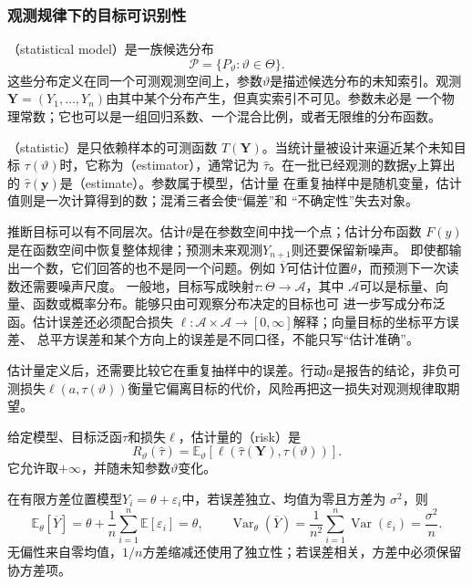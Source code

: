 \subsubsection{观测规律下的目标可识别性}
\label{sec:statistics-model-target}
\begin{definition}[统计模型与统计量]
  \label{def:statistics-model-statistic}
（statistical model）是一族候选分布
\[
  \mathcal{P}=\{P_\vartheta:\vartheta\in\Theta\}.
\]
这些分布定义在同一个可测观测空间上，参数\(\vartheta\)是描述候选分布的未知索引。观测
\(\bm{Y}=(Y_1,\ldots,Y_n)\)由其中某个分布产生，但真实索引不可见。参数未必是
一个物理常数；它也可以是一组回归系数、一个混合比例，或者无限维的分布函数。

（statistic）是只依赖样本的可测函数
\(T(\bm{Y})\)。当统计量被设计来逼近某个未知目标
\(\tau(\vartheta)\)时，它称为（estimator），通常记为
\(\widehat{\tau}\)。在一批已经观测的数据\(\bm{y}\)上算出的
\(\widehat{\tau}(\bm{y})\)是（estimate）。参数属于模型，估计量
在重复抽样中是随机变量，估计值则是一次计算得到的数；混淆三者会使“偏差”和
“不确定性”失去对象。
\end{definition}

推断目标可以有不同层次。估计\(\theta\)是在参数空间中找一个点；估计分布函数
\(F(y)\)是在函数空间中恢复整体规律；预测未来观测\(Y_{n+1}\)则还要保留新噪声。
即使都输出一个数，它们回答的也不是同一个问题。例如
\(\overline{Y}\)可估计位置\(\theta\)，而预测下一次读数还需要噪声尺度。
一般地，目标写成映射\(\tau:\Theta\to\mathcal A\)，其中
\(\mathcal A\)可以是标量、向量、函数或概率分布。能够只由可观察分布决定的目标也可
进一步写成分布泛函。估计误差还必须配合损失
\(\ell:\mathcal A\times\mathcal A\to[0,\infty]\)解释；向量目标的坐标平方误差、
总平方误差和某个方向上的误差是不同口径，不能只写“估计准确”。

估计量定义后，还需要比较它在重复抽样中的误差。行动\(a\)是报告的结论，非负可测损失\(\ell(a,\tau(\vartheta))\)衡量它偏离目标的代价，风险再把这一损失对观测规律取期望。
\begin{definition}[估计量的风险]
  \label{def:statistics-estimator-risk}
给定模型、目标泛函\(\tau\)和损失\(\ell\)，估计量的（risk）是
\[
  R_\vartheta(\widehat\tau)
  =\mathbb{E}_\vartheta[
    \ell(\widehat\tau(\bm Y),\tau(\vartheta))].
\]
它允许取\(+\infty\)，并随未知参数\(\vartheta\)变化。
\end{definition}

在有限方差位置模型\(Y_i=\theta+\varepsilon_i\)中，若误差独立、均值为零且方差为
\(\sigma^2\)，则
\[
  \mathbb{E}_\theta[\overline Y]
  =\theta+\frac1n\sum_{i=1}^n\mathbb{E}[\varepsilon_i]
  =\theta,\qquad
  \operatorname{Var}_\theta(\overline Y)
  =\frac1{n^2}\sum_{i=1}^n\operatorname{Var}(\varepsilon_i)
  =\frac{\sigma^2}{n}.
\]
无偏性来自零均值，\(1/n\)方差缩减还使用了独立性；若误差相关，方差中必须保留
协方差项。

